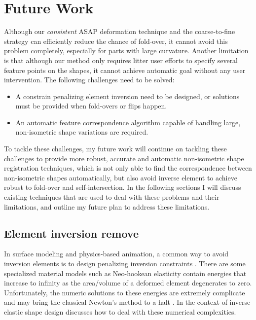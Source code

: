 \ifx\isEmbedded\undefined


	


\fi
\chapter{Future Work}
\label{chap:future}

Although our \emph{consistent} ASAP deformation technique and the coarse-to-fine strategy can efficiently reduce the chance of fold-over, it cannot avoid this problem completely, especially for parts with large curvature. Another limitation is that although our method only requires litter user efforts to specify several feature points on the shapes, it cannot achieve automatic goal without any user intervention. The following challenges need to be solved:

\begin{itemize}
\item A constrain penalizing element inversion need to be designed, or solutions must be provided when fold-overs or flips happen.
\item An automatic feature correspondence algorithm capable of handling large, non-isometric shape variations are required.
\end{itemize}

To tackle these challenges, my future work will continue on tackling these challenges to provide more robust, accurate and automatic non-isometric shape registration techniques, which is not only able to find the correspondence between non-isometric shapes automatically, but also avoid inverse element to achieve robust to fold-over and self-intersection. In the following sections I will discuss existing techniques that are used to deal with these problems and their limitations, and outline my future plan to address these limitations.

\section{Element inversion remove}
In surface modeling and physics-based animation, a common way to avoid inversion elements is to design penalizing inversion constraints \citep{irving2004invertible,chao2010simple,stomakhin2012energetically,setaluri2014fast,civit2014robust}. There are some specialized material models such as Neo-hookean elasticity \citep{bonet1997nonlinear} contain energies that increase to infinity as the area/volume of a deformed element degenerates to zero. Unfortunately, the numeric solutions to these energies are extremely complicate and may bring the classical Newton's method to a halt \citep{schuller2013locally}. In the context of inverse elastic shape design \citep{chen2014asymptotic} discusses how to deal with these numerical complexities.

